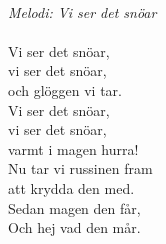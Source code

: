 \\
{\footnotesize\textit{Melodi: Vi ser det snöar}}\\
\\
Vi ser det snöar,\\
vi ser det snöar,\\
och glöggen vi tar.\\
Vi ser det snöar,\\
vi ser det snöar,\\
varmt i magen hurra!\\
Nu tar vi russinen fram\\
att krydda den med.\\
Sedan magen den får,\\
Och hej vad den mår.
